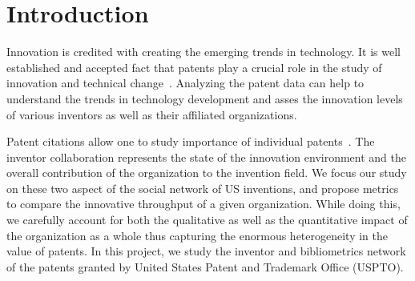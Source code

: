 \section{Introduction} 
% 
Innovation is credited with creating the emerging trends in technology. It is
well established and accepted fact that patents play a crucial role in the
study of innovation and technical change~\cite{narin1987patents}. Analyzing
the patent data can help to understand the trends in technology development
and asses the innovation levels of various inventors as well as their
affiliated organizations.

Patent citations allow one to study importance of individual
patents~\cite{albert1991direct}. The inventor collaboration represents the
state of the innovation environment and the overall contribution of the
organization to the invention field. We focus our study on these two aspect of
the social network of US inventions, and propose metrics to compare the
innovative throughput of a given organization. While doing this, we carefully
account for both the qualitative as well as the quantitative impact of the
organization as a whole thus capturing the enormous heterogeneity in the value
of patents. In this project, we study the inventor and bibliometrics network
of the patents granted by United States Patent and Trademark Office (USPTO).